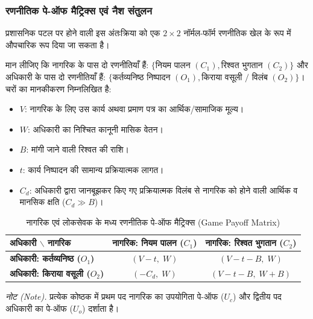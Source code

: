 \documentclass[11pt, a4paper]{article}
\begin{document}
\subsubsection{रणनीतिक पे-ऑफ मैट्रिक्स एवं नैश संतुलन}
प्रशासनिक पटल पर होने वाली इस अंतःक्रिया को एक $2 \times 2$ नॉर्मल-फॉर्म रणनीतिक खेल के रूप में औपचारिक रूप दिया जा सकता है। 

मान लीजिए कि नागरिक के पास दो रणनीतियाँ हैं: $\{ \text{नियम पालन } (C_1), \text{रिश्वत भुगतान } (C_2) \}$ और अधिकारी के पास दो रणनीतियाँ हैं: $\{ \text{कर्तव्यनिष्ठ निष्पादन } (O_1), \text{किराया वसूली / विलंब } (O_2) \}$। चरों का मानकीकरण निम्नलिखित है:
\begin{itemize}
    \item $V$: नागरिक के लिए उस कार्य अथवा प्रमाण पत्र का आर्थिक/सामाजिक मूल्य।
    \item $W$: अधिकारी का निश्चित कानूनी मासिक वेतन।
    \item $B$: मांगी जाने वाली रिश्वत की राशि।
    \item $t$: कार्य निष्पादन की सामान्य प्रक्रियात्मक लागत।
    \item $C_d$: अधिकारी द्वारा जानबूझकर किए गए प्रक्रियात्मक विलंब से नागरिक को होने वाली आर्थिक व मानसिक क्षति ($C_d \gg B$)।
\end{itemize}

\vspace{0.5\baselineskip}
\begin{table}[htbp]
\centering
\caption{नागरिक एवं लोकसेवक के मध्य रणनीतिक पे-ऑफ मैट्रिक्स (Game Payoff Matrix)}
\label{tab:game_payoff}
\begin{tabular*}{\textwidth}{@{\extracolsep{\fill}}lcc}
\toprule
\textbf{अधिकारी $\backslash$ नागरिक} & \textbf{नागरिक: नियम पालन ($C_1$)} & \textbf{नागरिक: रिश्वत भुगतान ($C_2$)} \\
\midrule
\textbf{अधिकारी: कर्तव्यनिष्ठ ($O_1$)} & $(V - t, \; W)$ & $(V - t - B, \; W)$ \\
\addlinespace
\textbf{अधिकारी: किराया वसूली ($O_2$)} & $(-C_d, \; W)$ & $(V - t - B, \; W + B)$ \\
\bottomrule
\end{tabular*}
\vspace{0.2em}
\begin{flushleft}
\footnotesize \textit{नोट (Note).} प्रत्येक कोष्ठक में प्रथम पद नागरिक का उपयोगिता पे-ऑफ ($U_c$) और द्वितीय पद अधिकारी का पे-ऑफ ($U_o$) दर्शाता है।
\end{flushleft}
\end{table}
\end{document}
